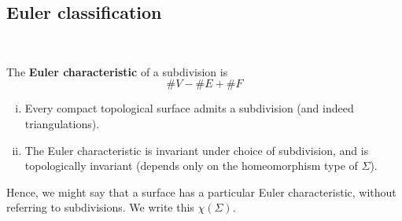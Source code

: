 \documentclass[a4paper]{article}
\begin{document}
\subsection{Euler classification}\
\vspace*{-1.5em}
\begin{definition}
	The \textbf{Euler characteristic} of a subdivision is
	\[
		\# V - \# E + \# F
	\]
\end{definition}
\begin{theorem}
	\begin{enumerate}[(i)]
		\item Every compact topological surface admits a subdivision (and indeed triangulations).
		\item The Euler characteristic is invariant under choice of subdivision, and is topologically invariant (depends only on the homeomorphism type of $\Sigma$). 
	\end{enumerate}
	Hence, we might say that a surface has a particular Euler characteristic, without referring to subdivisions.
	We write this \( \chi(\Sigma) \).
\end{theorem}
\end{document}
